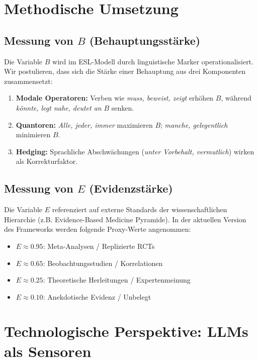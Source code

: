 \documentclass[11pt, a4paper]{article}
\begin{document}
\section{Methodische Umsetzung}

\subsection{Messung von $B$ (Behauptungsstärke)}

Die Variable $B$ wird im ESL-Modell durch linguistische Marker operationalisiert. Wir postulieren, dass sich die Stärke einer Behauptung aus drei Komponenten zusammensetzt:
\begin{enumerate}
    \item \textbf{Modale Operatoren:} Verben wie \textit{muss, beweist, zeigt} erhöhen $B$, während \textit{könnte, legt nahe, deutet an} $B$ senken.
    \item \textbf{Quantoren:} \textit{Alle, jeder, immer} maximieren $B$; \textit{manche, gelegentlich} minimieren $B$.
    \item \textbf{Hedging:} Sprachliche Abschwächungen (\textit{unter Vorbehalt, vermutlich}) wirken als Korrekturfaktor.
\end{enumerate}

\subsection{Messung von $E$ (Evidenzstärke)}

Die Variable $E$ referenziert auf externe Standards der wissenschaftlichen Hierarchie (z.B. Evidence-Based Medicine Pyramide). In der aktuellen Version des Frameworks werden folgende Proxy-Werte angenommen:
\begin{itemize}
    \item $E \approx 0.95$: Meta-Analysen / Replizierte RCTs
    \item $E \approx 0.65$: Beobachtungsstudien / Korrelationen
    \item $E \approx 0.25$: Theoretische Herleitungen / Expertenmeinung
    \item $E \approx 0.10$: Anekdotische Evidenz / Unbelegt
\end{itemize}

\section{Technologische Perspektive: LLMs als Sensoren}
\end{document}
